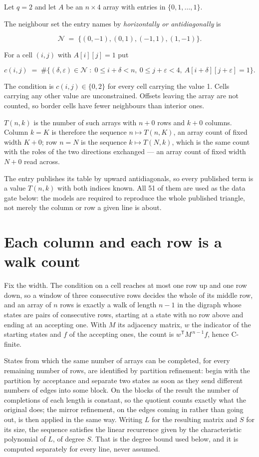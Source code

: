 \documentclass[11pt]{article}
\theoremstyle{definition}
\begin{document}
Let $q = 2$ and let $A$ be an $n \times 4$ array with entries in $\{0,1,\dots,1\}$.

The neighbour set the entry names by {\itshape horizontally or antidiagonally} is

\[\mathcal{N} \;=\; \{(0,-1), (0,1), (-1,1), (1,-1)\}.\]

For a cell $(i,j)$ with $A[i][j] = 1$ put

\[c(i,j) \;=\; \#\bigl\{(\delta,\varepsilon)\in\mathcal{N} \;:\; 0\le i+\delta<n,\ 0\le j+\varepsilon<4,\ A[i+\delta][j+\varepsilon] = 1\bigr\}.\]

The condition is $c(i,j) \in \{0, 2\}$ for every cell carrying the value 1. Cells carrying any other value are unconstrained. Offsets leaving the array are not counted, so border cells have fewer neighbours than interior ones.

$T(n,k)$ is the number of such arrays with $n + 0$ rows and $k + 0$ columns. Column $k = K$ is therefore the sequence $n \mapsto T(n,K)$, an array count of fixed width $K + 0$; row $n = N$ is the sequence $k \mapsto T(N,k)$, which is the same count with the roles of the two directions exchanged --- an array count of fixed width $N + 0$ read across.

The entry publishes its table by upward antidiagonals, so every published term is a value $T(n,k)$ with both indices known. All 51 of them are used as the data gate below: the models are required to reproduce the whole published triangle, not merely the column or row a given line is about.

\section{Each column and each row is a walk count}

Fix the width. The condition on a cell reaches at most one row up and one row down, so a window of three consecutive rows decides the whole of its middle row, and an array of $n$ rows is exactly a walk of length $n-1$ in the digraph whose states are pairs of consecutive rows, starting at a state with no row above and ending at an accepting one. With $M$ its adjacency matrix, $w$ the indicator of the starting states and $f$ of the accepting ones, the count is $w^{\mathsf T}M^{\,n-1}f$, hence C-finite.

States from which the same number of arrays can be completed, for every remaining number of rows, are identified by partition refinement: begin with the partition by acceptance and separate two states as soon as they send different numbers of edges into some block. On the blocks of the result the number of completions of each length is constant, so the quotient counts exactly what the original does; the mirror refinement, on the edges coming in rather than going out, is then applied in the same way. Writing $L$ for the resulting matrix and $S$ for its size, the sequence satisfies the linear recurrence given by the characteristic polynomial of $L$, of degree $S$. That is the degree bound used below, and it is computed separately for every line, never assumed.
\end{document}
